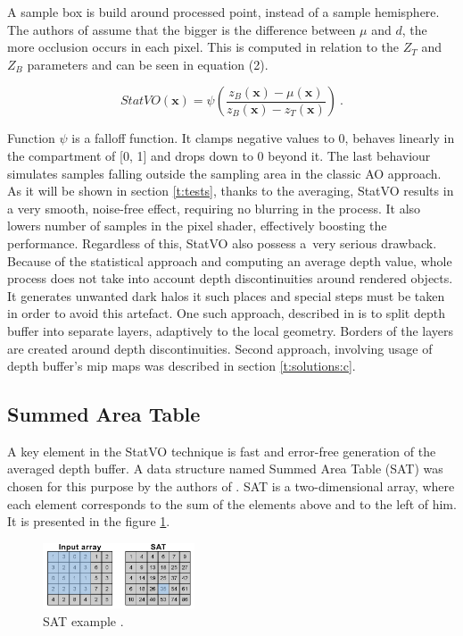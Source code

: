 \documentclass[10pt,journal,compsoc,twoside]{IEEEtran}
\begin{document}
	 A sample box is build around processed point, instead of a sample hemisphere. The authors of \cite{statvo} assume that the bigger is the difference between \(\mu\) and \(d\), the more occlusion occurs in each pixel. This is computed in relation to the \(Z_{T}\) and \(Z_{B}\) parameters and can be seen in equation (2).
	 
	 \begin{equation}
	 \mathit{StatVO}(\mathbf{x}) = \psi(\frac{z_{B}(\mathbf{x}) - \mu(\mathbf{x})}{z_{B}(\mathbf{x}) - z_{T}(\mathbf{x})})\ .
	 \end{equation}
	 
	 Function \(\psi\) is a falloff function. It clamps negative values to 0, behaves linearly in the compartment of [0, 1] and drops down to 0 beyond it. The last behaviour simulates samples falling outside the sampling area in the classic AO approach. As it will be shown in section \ref{t:tests}, thanks to the averaging, StatVO results in a very smooth, noise-free effect, requiring no blurring in the process. It also lowers number of samples in the pixel shader, effectively boosting the performance. Regardless of this, StatVO also possess a~very serious drawback. Because of the statistical approach and computing an average depth value, whole process does not take into account depth discontinuities around rendered objects. It generates unwanted dark halos it such places and special steps must be taken in order to avoid this artefact. One such approach, described in \cite{statvo} is to split depth buffer into separate layers, adaptively to the local geometry. Borders of the layers are created around depth discontinuities. Second approach, involving usage of depth buffer's mip maps was described in section \ref{t:solutions:c}.
	
	\subsection{Summed Area Table}\label{t:related:sat}
	
	A key element in the StatVO technique is fast and error-free generation of the averaged depth buffer. A data structure named Summed Area Table (SAT) was chosen for this purpose by the authors of \cite{statvo}. SAT is a two-dimensional array, where each element corresponds to the sum of the elements above and to the left of him. It is presented in the figure \ref{fig:2_D}.
	
	\begin{figure}[ht]
		\centering
		\includegraphics[width=0.4\textwidth]{fig_2_D.png}
		\caption{SAT example \cite{sat}.}
		\label{fig:2_D}
	\end{figure}
\end{document}
